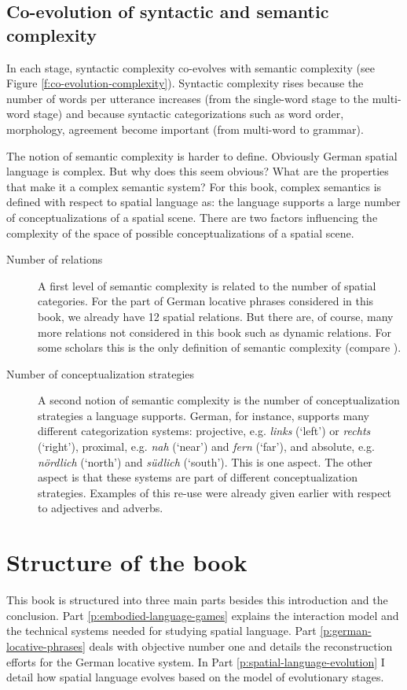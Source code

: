 \subsection{Co-evolution of syntactic and semantic complexity}
In each stage, syntactic complexity co-evolves
with semantic complexity (see Figure \ref{f:co-evolution-complexity}). 
Syntactic complexity rises because the number of words
per utterance increases (from the single-word stage to the multi-word stage) 
and because syntactic categorizations such as word order, morphology, 
agreement become important (from multi-word to grammar).

The notion of semantic complexity is harder to define. Obviously
German spatial language is complex. But why does this seem obvious? 
What are the properties that make it a complex semantic system? For this book, 
complex semantics is defined with respect to spatial language as: the language supports a large 
number of conceptualizations of a spatial scene. There are two factors influencing 
the complexity of the space of possible conceptualizations of a spatial scene.

\begin{description}
\item[Number of relations] A first level of semantic complexity
is related to the number of spatial categories. For the part
of German locative phrases considered in this book, we already have 
12 spatial relations. But there are, of course, many more relations not considered
in this book such as  dynamic relations. 
For some scholars this is the only definition of semantic complexity (compare 
\citealp{schoenemann1999syntax}).
\item[Number of conceptualization strategies]
A second notion of semantic complexity is the number of
conceptualization strategies a language supports. German, for instance, supports
many different categorization systems: projective, e.g. \textit{links} (`left') or \textit{rechts} (`right'), 
proximal, e.g. \textit{nah} (`near') and \textit{fern} (`far'), and absolute, e.g. \textit{n\"ordlich} (`north') 
and \textit{s\"udlich} (`south'). This is one aspect. The other aspect is that
these systems are part of different conceptualization strategies. 
Examples of this re-use were already given earlier with respect to adjectives and adverbs.
\end{description}

\section{Structure of the book}
\label{s:intro-structure}
This book is structured into three main parts besides this introduction 
and the conclusion. Part \ref{p:embodied-language-games} explains the interaction
model and the technical systems needed for studying spatial language.
Part \ref{p:german-locative-phrases} deals with objective number one and details the reconstruction
efforts for the German locative system. In Part \ref{p:spatial-language-evolution} I detail how spatial
language evolves based on the model of evolutionary stages.


